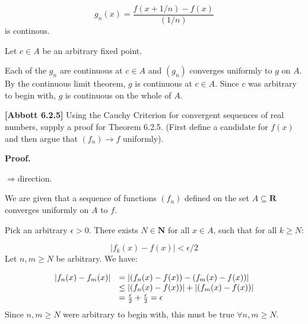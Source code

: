 \documentclass[10pt]{article}
\begin{document}
\begin{equation*}
g_{n}( x) =\frac{f( x+1/n) -f( x)}{( 1/n)}
\end{equation*}
is continous. 



Let $\displaystyle c\in A$ be an arbitrary fixed point.



Each of the $\displaystyle g_{n}$ are continuous at $\displaystyle c\in A$ and $\displaystyle ( g_{n})$ converges uniformly to $\displaystyle g$ on $\displaystyle A$. By the continuous limit theorem, $\displaystyle g$ is continuous at $\displaystyle c\in A$. Since $\displaystyle c$ was arbitrary to begin with, $\displaystyle g$ is continuous on the whole of $\displaystyle A$.



\textbf{[Abbott 6.2.5]} Using the Cauchy Criterion for convergent sequences of real numbers, supply a proof for Theorem 6.2.5. (First define a candidate for $\displaystyle f( x)$ and then argue that $\displaystyle ( f_{n})\rightarrow f$ uniformly).



\textbf{Proof.}



$\displaystyle \Longrightarrow $direction.



We are given that a sequence of functions $\displaystyle ( f_{n})$ defined on the set $\displaystyle A\subseteq \mathbf{R}$ converges uniformly on $\displaystyle A$ to $\displaystyle f$. 



Pick an arbitrary $\displaystyle \epsilon  >0$. There exists $\displaystyle N\in \mathbf{N}$ for all $\displaystyle x\in A$, such that for all $\displaystyle k\geq N$:


\begin{equation*}
|f_{k}( x) -f( x) |< \epsilon /2
\end{equation*}
Let $\displaystyle n,m\geq N$ be arbitrary. We have:


\begin{equation*}
\begin{array}{ c l }
|f_{n}( x) -f_{m}( x) | & =|( f_{n}( x) -f( x)) -( f_{m}( x) -f( x)) |\\
 & \leq |( f_{n}( x) -f( x)) |+|( f_{m}( x) -f( x)) |\\
 & =\frac{\epsilon }{2} +\frac{\epsilon }{2} =\epsilon 
\end{array}
\end{equation*}
Since $\displaystyle n,m\geq N$ were arbitrary to begin with, this must be true $\displaystyle \forall n,m\geq N$.
\end{document}

